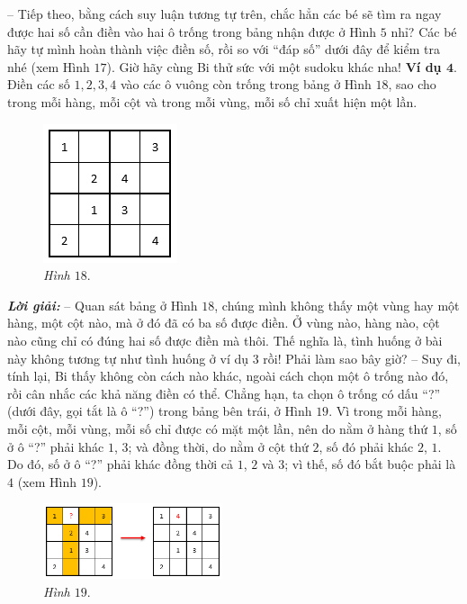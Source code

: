 	-- Tiếp theo, bằng cách suy luận tương tự trên, chắc hẳn các bé sẽ tìm ra ngay được hai số cần điền vào hai ô trống trong bảng nhận được ở Hình $5$ nhỉ? Các bé hãy tự mình hoàn thành việc điền số, rồi so với “đáp số” dưới đây để kiểm tra nhé (xem Hình $17$).
	\vskip 0.1cm
	Giờ hãy cùng Bi thử sức với một sudoku  khác nha!
	\vskip 0.1cm
		\textbf{\color{toancuabi}Ví dụ $\pmb{4.}$} Điền các số $1, 2, 3, 4$ vào các ô vuông còn trống trong bảng ở Hình $18$, sao cho trong mỗi hàng, mỗi cột và trong mỗi vùng, mỗi số chỉ xuất hiện một lần.
		\vskip 0.1cm
		\begin{figure}
			\centering
			\vspace*{-18pt}
			\captionsetup{labelformat= empty, justification=centering}
			\includegraphics[scale=0.8]{pic7}
			\caption{\small\textit{Hình $18.$}}
			\vspace*{-20pt}
		\end{figure}
	\textbf{\color{toancuabi}\textit{Lời giải:}}
	\vskip 0.1cm
	-- Quan sát bảng ở Hình $18$, chúng mình không thấy một vùng hay một hàng, một cột nào, mà ở đó đã có ba số được điền. Ở vùng nào, hàng nào, cột nào cũng chỉ có đúng hai số được điền mà thôi. Thế nghĩa là, tình huống ở bài này không tương tự như tình huống ở ví dụ $3$ rồi! Phải làm sao bây giờ?
	\vskip 0.2cm
	-- Suy đi, tính lại, Bi thấy không còn cách nào khác, ngoài cách chọn một ô trống nào đó, rồi cân nhắc các khả năng điền có thể. Chẳng hạn, ta chọn ô trống có dấu “?” (dưới đây, gọi tắt là ô “?”) trong bảng bên trái, ở Hình $19$. Vì trong mỗi hàng, mỗi cột, mỗi vùng, mỗi số chỉ được có mặt một lần, nên do nằm ở hàng thứ $1$, số ở ô “?” phải khác $1$, $3$; và đồng thời, do nằm ở cột thứ $2$, số đó phải khác $2$, $1$. Do đó, số ở ô “?” phải khác đồng thời cả $1$, $2$ và $3$; vì thế, số đó bắt buộc phải là $4$ (xem Hình $19$).
	\vskip 0.1cm
		\begin{figure}
			\centering
			\vspace*{-15pt}
			\captionsetup{labelformat= empty, justification=centering}
			\includegraphics[width=0.47\textwidth]{pic8}
			\vspace*{-5pt}
			\caption{\small\textit{Hình $19.$}}
			\vspace*{-25pt}
		\end{figure}
